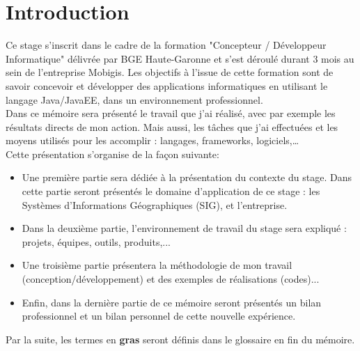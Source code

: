 \chapter{Introduction} 
\label{Introduction}

Ce stage s'inscrit dans le cadre de la formation "Concepteur / Développeur Informatique" délivrée par BGE Haute-Garonne et s'est déroulé durant 3 mois au sein de l'entreprise Mobigis. Les objectifs à l'issue de cette formation sont de savoir concevoir et développer des applications informatiques en utilisant le langage Java/JavaEE, dans un environnement professionnel.\\

Dans ce mémoire sera présenté le travail que j'ai réalisé, avec par exemple les résultats directs de mon action. Mais aussi, les tâches que j'ai effectuées et les moyens utilisés pour les accomplir : langages, frameworks, logiciels,…\\
 
Cette présentation s'organise de la façon suivante:\newline

\begin{itemize}
\item Une première partie sera dédiée à la présentation du contexte du stage. Dans cette partie seront présentés le domaine d'application de ce stage : les Systèmes d'Informations Géographiques (SIG), et l'entreprise.\\

\item Dans la deuxième partie, l'environnement de travail du stage sera expliqué : projets, équipes, outils, produits,...\\

\item Une troisième partie présentera la méthodologie de mon travail (conception/développement) et des exemples de réalisations (codes)...\\

\item Enfin, dans la dernière partie de ce mémoire seront présentés un bilan professionnel et un bilan personnel de cette nouvelle expérience.\newline

\end{itemize}

Par la suite, les termes en \textbf{gras} seront définis dans le glossaire en fin du mémoire.

